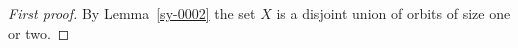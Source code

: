 \begin{proof}[First proof]\label{sy-0004}
By Lemma~\ref{sy-0002} the set $X$ is a disjoint union of orbits of size one or two.
\end{proof}